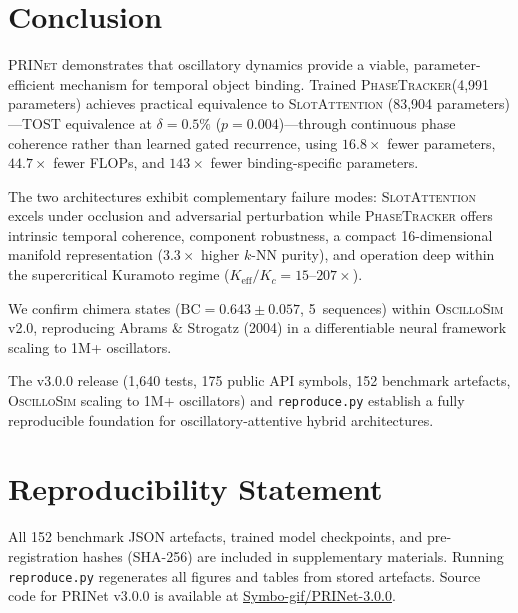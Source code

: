 \documentclass[11pt]{article}
\providecommand{\prinet}{\textnormal{\textsc{PRINet}}\xspace}
\providecommand{\oscillosim}{\textnormal{\textsc{OscilloSim}}\xspace}
\providecommand{\pt}{\textnormal{\textsc{PhaseTracker}}\xspace}
\providecommand{\sa}{\textnormal{\textsc{SlotAttention}}\xspace}
\providecommand{\bc}{\text{BC}}
\begin{document}
\section{Conclusion}
\label{sec:conclusion}

\prinet demonstrates that oscillatory dynamics provide a viable,
parameter-efficient mechanism for temporal object binding.  Trained
\pt (4{,}991 parameters) achieves practical equivalence to \sa
(83{,}904 parameters)---TOST equivalence at $\delta = 0.5\%$ ($p =
0.004$)---through continuous phase coherence rather than learned
gated recurrence, using $16.8\times$ fewer parameters, $44.7\times$
fewer FLOPs, and $143\times$ fewer binding-specific parameters.

The two architectures exhibit complementary failure modes: \sa excels
under occlusion and adversarial perturbation while \pt offers
intrinsic temporal coherence, component robustness, a compact
16-dimensional manifold representation ($3.3\times$ higher
$k$-NN purity), and operation deep within the supercritical Kuramoto
regime ($K_{\text{eff}}/K_c = 15$--$207\times$).

We confirm chimera states ($\bc = 0.643 \pm 0.057$, 5~sequences) within
\oscillosim v2.0, reproducing Abrams \& Strogatz (2004) in a
differentiable neural framework scaling to 1M+ oscillators.

The v3.0.0 release (1{,}640 tests, 175 public API symbols, 152
benchmark artefacts, \oscillosim scaling to 1M+ oscillators) and
\texttt{reproduce.py} establish a fully reproducible foundation for
oscillatory-attentive hybrid architectures.

\section*{Reproducibility Statement}

All 152 benchmark JSON artefacts, trained model checkpoints, and
pre-registration hashes (SHA-256) are included in supplementary
materials.  Running \texttt{reproduce.py} regenerates all figures
and tables from stored artefacts.  Source code for PRINet v3.0.0 is
available at \href{https://github.com/Symbo-gif/PRINet-3.0.0}{Symbo-gif/PRINet-3.0.0}.
\end{document}
